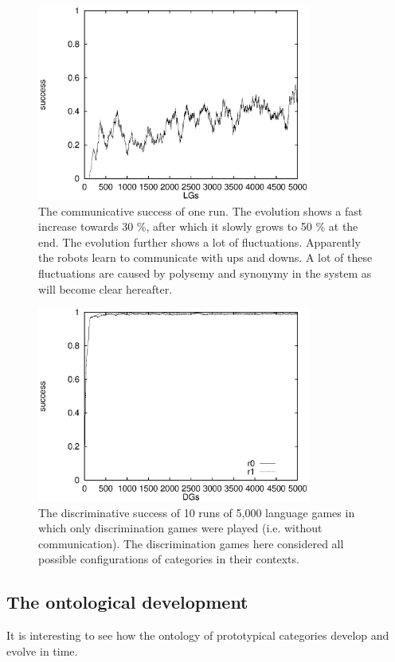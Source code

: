 \begin{figure}[p]
\centerline{\includegraphics[width=9cm]{basic/cs0.eps}}
\caption{The communicative success of one run. The evolution shows a fast increase towards 30 \%, after which it slowly grows to 50 \% at the end. The evolution further shows a lot of fluctuations. Apparently the robots learn to communicate with ups and downs. A lot of these fluctuations are caused by polysemy and synonymy in the system as will become clear hereafter.}
\label{f:st:cs0}
\end{figure}
\begin{figure}[p]
	\centerline{\includegraphics[width=9cm]{basic/dsall.eps}}
	\caption{The discriminative success of 10 runs of 5,000 language games in which only discrimination games were played (i.e. without communication). The discrimination games here considered all possible configurations of categories in their contexts.}
	\label{f:st:ds}
\end{figure}

\clearpage
\subsection{The ontological development}\label{s:cat:evol}
It is interesting to see how the ontology of prototypical categories develop and evolve in time.

